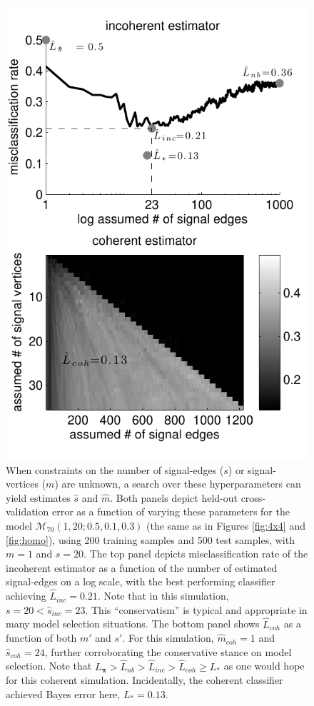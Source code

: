 \documentclass[10pt,journal,cspaper,compsoc]{IEEEtran}
\providecommand{\mc}[1]{\mathcal{#1}}
\providecommand{\mb}[1]{\boldsymbol{#1}}
\providecommand{\wh}[1]{\widehat{#1}}
\begin{document}
\begin{figure}[htbp]
	\centering
		\includegraphics[width=0.8\linewidth]{../figs/coherent_image_V70_s20_p10_q30_nTr200_nTe500.pdf}
	\caption{When constraints on the number of signal-edges ($s$) or signal-vertices ($m$) are unknown, a search over these hyperparameters can yield estimates $\wh{s}$ and $\wh{m}$.  Both panels depict held-out cross-validation error as a function of varying these parameters for the model 
	$\mc{M}_{70}(1,20;0.5,0.1,0.3)$
	(the same as in Figures \ref{fig:4x4} and \ref{fig:homo}), using 200 training samples and 500 test samples, with $m=1$ and $s=20$.  The top panel depicts misclassification rate of the incoherent estimator as a function of the number of estimated signal-edges on a log scale, with the best performing classifier achieving $\wh{L}_{inc}=0.21$. Note that in this simulation,  $s=20< \wh{s}_{inc}=23$.  This ``conservatism'' is typical and appropriate in many model selection situations.  The bottom panel shows $\wh{L}_{coh}$ as a function of both $m'$ and $s'$.  For this simulation, $\wh{m}_{coh}=1$ and $\wh{s}_{coh}=24$, further corroborating the conservative stance on model selection. Note that $L_{\mb{\pi}} > \wh{L}_{nb} > \wh{L}_{inc} > \wh{L}_{coh} \geq L_*$ as one would hope for this coherent simulation.  Incidentally, the coherent classifier achieved Bayes error here, $L_*=0.13$.}
	\label{fig:coherent}
\end{figure}
\end{document}
